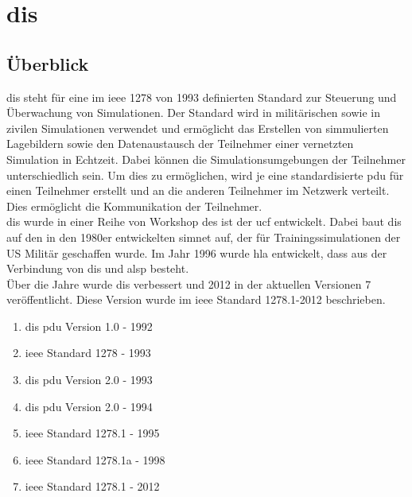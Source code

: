 \chapter{\ac{dis}}

\section{Überblick}
\onehalfspacing
\ac{dis} steht für eine im \ac{ieee} 1278 von 1993 definierten Standard zur Steuerung und Überwachung von Simulationen. Der Standard wird in militärischen sowie in zivilen Simulationen verwendet und  ermöglicht das Erstellen von simmulierten Lagebildern sowie den Datenaustausch der Teilnehmer einer vernetzten Simulation in Echtzeit. Dabei können die Simulationsumgebungen der Teilnehmer unterschiedlich sein.  Um dies zu ermöglichen, wird je eine standardisierte \ac{pdu} für einen Teilnehmer erstellt und an die anderen Teilnehmer im Netzwerk verteilt. Dies ermöglicht die Kommunikation der Teilnehmer.
\\
\ac{dis} wurde in einer Reihe von Workshop des  \ac{ist} der \ac{ucf} entwickelt. Dabei baut \ac{dis} auf den in den 1980er entwickelten \ac{simnet} auf, der für Trainingssimulationen der US Militär geschaffen wurde. Im  Jahr 1996 wurde \ac{hla} entwickelt, dass aus der Verbindung von \ac{dis} und \ac{alsp} besteht.  
\\
Über die Jahre wurde \ac{dis} verbessert und 2012 in der aktuellen Versionen 7 veröffentlicht. Diese Version wurde im \ac{ieee} Standard 1278.1-2012 beschrieben.

\begin{enumerate}
	\singlespacing
	\item \ac{dis} \ac{pdu} Version 1.0  - 1992
	\item \ac{ieee} Standard 1278 - 1993
	\item	\ac{dis} \ac{pdu} Version 2.0 - 1993
	\item 	\ac{dis} \ac{pdu}	Version 2.0 - 1994
	\item 	\ac{ieee} Standard 1278.1 - 1995
	\item 	\ac{ieee} Standard	1278.1a - 1998
	\item 	\ac{ieee} Standard 1278.1 - 2012
		
\end{enumerate}

\cite{SimulationInteroperabilityStandardsOrganizationInc.}
\cite{Wikipedia.31.03.2018}
\cite{MarkMcCall.}
\onehalfspacing
\newpage
